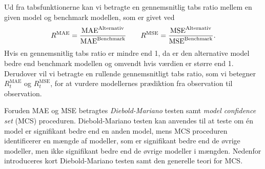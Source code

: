 Ud fra tabsfunktionerne kan vi betragte en gennemsnitlig tabs ratio mellem en given model og benchmark modellen, som er givet ved
\begin{align}
R^{\text{MAE}} = \frac{\text{MAE}^{\text{Alternativ}}}{\text{MAE}^{\text{Benchmark}}} \qquad R^{\text{\text{MSE}}} = \frac{\text{MSE}^{\text{Alternativ}}}{\text{MSE}^{\text{Benchmark}}}. \label{eq:gennemsnitligtabsratio}
\end{align} 
Hvis en gennemsnitlig tabs ratio er mindre end 1, da er den alternative model bedre end benchmark modellen og omvendt hvis værdien er større end 1. 
Derudover vil vi betragte en rullende gennemsnitligt tabs ratio, som vi betegner $R_t^\text{MAE}$ og $R_{t}^\text{MSE}$, for at vurdere modellernes prædiktion fra observation til observation.
%

Foruden MAE og MSE betragtes \textit{Diebold-Mariano} testen samt \textit{model confidence set} (MCS) proceduren.
Diebold-Mariano testen kan anvendes til at teste om én model er signifikant bedre end en anden model, mens MCS proceduren identificerer en mængde af modeller, som er signifikant bedre end de øvrige modeller, men ikke signifikant bedre end de øvrige modeller i mængden.
Nedenfor introduceres kort Diebold-Mariano testen samt den generelle teori for MCS.



